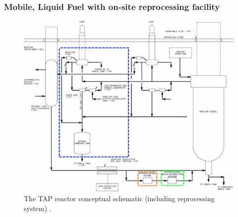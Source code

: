 


\begin{frame} %
\frametitle{Mobile, Liquid Fuel with on-site reprocessing facility}
\vspace{-3mm}
\begin{figure}[t]
      \includegraphics[height=0.67\textwidth]{./images/tap_primary_loop.png}
    \vspace{-2mm}
	\caption{The TAP reactor conceptual schematic (including reprocessing 
	system) \cite{transatomic_power_corporation_technical_2016}.}
\end{figure}   

\end{frame}


